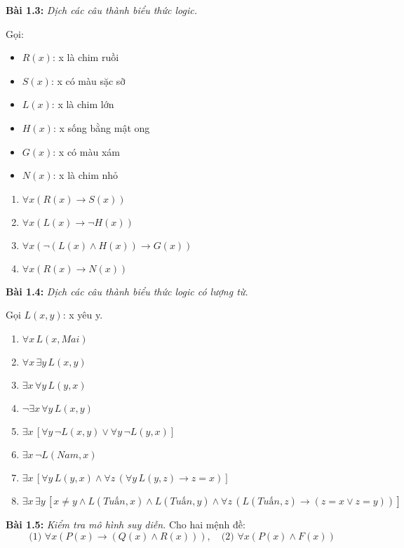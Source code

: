 \documentclass[12pt]{article}
\begin{document}
\vspace{1em}
\noindent\textbf{Bài 1.3:} \textit{Dịch các câu thành biểu thức logic.}

Gọi:
\begin{itemize}
  \item $R(x)$: x là chim ruồi
  \item $S(x)$: x có màu sặc sỡ
  \item $L(x)$: x là chim lớn
  \item $H(x)$: x sống bằng mật ong
  \item $G(x)$: x có màu xám
  \item $N(x)$: x là chim nhỏ
\end{itemize}

\begin{enumerate}[label=\alph*)]
\item $\forall x (R(x) \rightarrow S(x))$
\item $\forall x (L(x) \rightarrow \neg H(x))$
\item $\forall x (\neg(L(x) \land H(x)) \rightarrow G(x))$
\item $\forall x (R(x) \rightarrow N(x))$
\end{enumerate}

\vspace{1em}
\noindent\textbf{Bài 1.4:} \textit{Dịch các câu thành biểu thức logic có lượng từ.}

Gọi $L(x, y)$: x yêu y.

\begin{enumerate}[label=\alph*)]
\item $\forall x\, L(x, Mai)$
\item $\forall x\, \exists y\, L(x, y)$
\item $\exists x\, \forall y\, L(y, x)$
\item $\neg \exists x\, \forall y\, L(x, y)$
\item $\exists x\, [\forall y\, \neg L(x, y) \lor \forall y\, \neg L(y, x)]$
\item $\exists x\, \neg L(Nam, x)$
\item $\exists x\, [\forall y\, L(y, x) \land \forall z\, (\forall y\, L(y, z) \rightarrow z = x)]$
\item $\exists x\, \exists y\, [x \ne y \land L(Tuấn, x) \land L(Tuấn, y) \land \forall z\, (L(Tuấn, z) \rightarrow (z = x \lor z = y))]$
\end{enumerate}

\vspace{1em}
\noindent\textbf{Bài 1.5:} \textit{Kiểm tra mô hình suy diễn.}
Cho hai mệnh đề:
\[
\text{(1) } \forall x (P(x) \rightarrow (Q(x) \land R(x))), \quad
\text{(2) } \forall x (P(x) \land F(x))
\]
\end{document}
